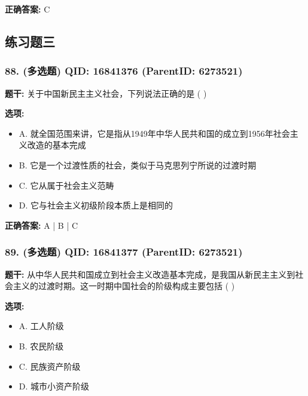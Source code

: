 \documentclass[12pt,UTF8]{ctexart}
\begin{document}
\textbf{正确答案:}
C

\vspace{0.3em}\hrulefill\vspace{0.7em}

\subsection*{练习题三}

\subsubsection*{88. (多选题) \small QID: 16841376 (ParentID: 6273521)}

\textbf{题干:}
关于中国新民主主义社会，下列说法正确的是 ( )



\textbf{选项:}
\begin{itemize}[leftmargin=*]

  \item A. 就全国范围来讲，它是指从1949年中华人民共和国的成立到1956年社会主义改造的基本完成

  \item B. 它是一个过渡性质的社会，类似于马克思列宁所说的过渡时期

  \item C. 它从属于社会主义范畴

  \item D. 它与社会主义初级阶段本质上是相同的

\end{itemize}

\textbf{正确答案:}
A | B | C

\vspace{0.3em}\hrulefill\vspace{0.7em}

\subsubsection*{89. (多选题) \small QID: 16841377 (ParentID: 6273521)}

\textbf{题干:}
从中华人民共和国成立到社会主义改造基本完成，是我国从新民主主义到社会主义的过渡时期。这一时期中国社会的阶级构成主要包括 ( )



\textbf{选项:}
\begin{itemize}[leftmargin=*]

  \item A. 工人阶级

  \item B. 农民阶级

  \item C. 民族资产阶级

  \item D. 城市小资产阶级

\end{itemize}
\end{document}
